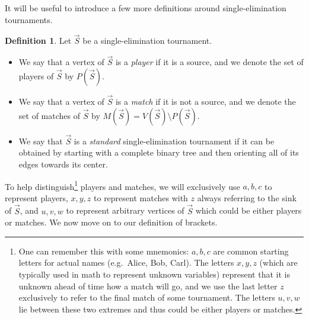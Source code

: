 \documentclass[12pt,letterpaper]{article}
\theoremstyle{definition}
\newtheorem{defn}{Definition}
\renewcommand{\1}{\mathbbm{1}}
\newcommand{\sm}{\setminus}
\newcommand{\tour}{\vec{S}}
\begin{document}
 It will be useful to introduce a few more definitions around single-elimination tournaments.

\begin{defn}
	Let $\tour$ be a single-elimination tournament.
	\begin{itemize}
		\item We say that a vertex of $\tour$ is a \textit{player} if it is a source, and we denote the set of players of $\tour$ by $P(\tour)$.
		\item We say that a vertex of $\tour$ is a \textit{match} if it is not a source, and we denote the set of matches of $\tour$ by $M(\tour)=V(\tour)\sm P(\tour)$.
		\item We say that $\tour$ is a \textit{standard} single-elimination tournament if it can be obtained by starting with a complete binary tree and then orienting all of its edges towards its center.
		\end{itemize}
\end{defn}
To help distinguish\footnote{One can remember this with some mnemonics: $a,b,c$ are common starting letters for actual names (e.g.\ Alice, Bob, Carl).  The letters $x,y,z$ (which are typically used in math to represent unknown variables) represent that it is unknown ahead of time how a match will go, and we use the last letter $z$ exclusively to refer to the final match of some tournament.  The letters $u,v,w$ lie between these two extremes and thus could be either players or matches.} players and matches, we will exclusively use $a,b,c$ to represent players, $x,y,z$ to represent matches with $z$ always referring to the sink of $\tour$, and $u,v,w$ to represent arbitrary vertices of $\tour$ which could be either players or matches.   We now move on to our definition of brackets.  
\end{document}
